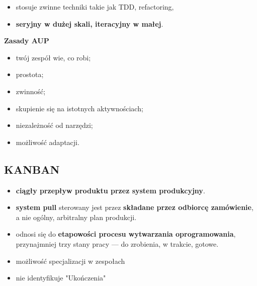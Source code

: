 \documentclass[a4paper]{article}
\begin{document}
    \begin{itemize}
        \item stosuje zwinne techniki takie jak TDD, refactoring,
        \item \textbf{seryjny w dużej skali, iteracyjny w małej}.
    \end{itemize}

    \textbf{Zasady AUP}
    \begin{itemize}
        \item twój zespół wie, co robi;
        \item prostota;
        \item zwinność;
        \item skupienie się na istotnych aktywnościach;
        \item niezależność od narzędzi;
        \item możliwość adaptacji.
    \end{itemize}

    \subsection{KANBAN}


    \begin{itemize}
        \item \textbf{ciągły przepływ produktu przez system produkcyjny}.
        \item \textbf{system pull} sterowany
        jest przez \textbf{składane przez odbiorcę zamówienie}, a nie ogólny, arbitralny plan produkcji.
        \item odnosi się do \textbf{etapowości procesu wytwarzania
        oprogramowania}, przynajmniej trzy stany pracy — do zrobienia, w trakcie, gotowe.
        \item możliwość specjalizacji w zespołach
        \item nie identyfikuje "Ukończenia"
    \end{itemize}
\end{document}
